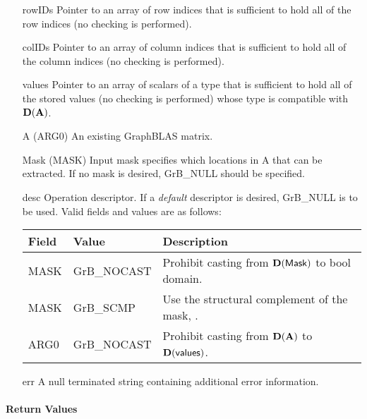 \begin{itemize}[leftmargin=1.1in]
    \item[{\sf rowIDs}] Pointer to an array of row indices that is sufficient to
                        hold all of the row indices (no checking is performed).
    \item[{\sf colIDs}] Pointer to an array of column indices that is sufficient to
                        hold all of the column indices (no checking is performed). 
    \item[{\sf values}] Pointer to an array of scalars of a type that is sufficient to
                        hold all of the stored values (no checking is performed) whose
                        type is compatible with $\bold{D}({\bf A})$.
    \item[{\sf A}]      ({\sf ARG0}) An existing GraphBLAS matrix.
    \item[{\sf Mask}]   ({\sf MASK}) Input mask specifies which locations in
                        {\sf A} that can be extracted.  If no mask is desired,
                        {\sf GrB\_NULL} should be specified.
    \item[{\sf desc}]   Operation descriptor. If a
    \emph{default} descriptor is desired, {\sf GrB\_NULL} is to be
    used.  Valid fields and values are as follows: \\
    \begin{tabular}{lll}
    Field  & Value & Description \\
    \hline
    {\sf MASK} & {\sf GrB\_NOCAST} & Prohibit casting from $\bold{D}({\sf Mask})$ to {\sf bool} domain. \\
    {\sf MASK} & {\sf GrB\_SCMP}   & Use the structural complement of the mask, . \\
    {\sf ARG0} & {\sf GrB\_NOCAST} & Prohibit casting from $\bold{D}({\bf A})$ to $\bold{D}({\sf values})$. \\
    \end{tabular}
    \item[{\sf err}]     A null terminated string containing additional error information.
\end{itemize}

\paragraph{Return Values}


